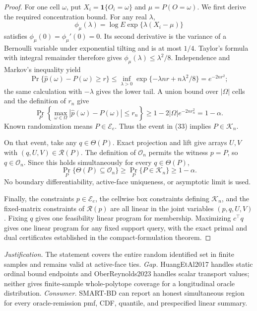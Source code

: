\documentclass{article}
\begin{document}
\begin{proof}
For one cell \(\omega\), put \(X_i=\mathbf 1\{O_i=\omega\}\) and \(\mu=P(O=\omega)\).  We first derive the required concentration bound.  For any real \(\lambda\),
\[
 \phi_\mu(\lambda)
 =\log E\exp\{\lambda(X_i-\mu)\}
\]
satisfies \(\phi_\mu(0)=\phi_\mu'(0)=0\).  Its second derivative is the variance of a Bernoulli variable under exponential tilting and is at most \(1/4\).  Taylor's formula with integral remainder therefore gives \(\phi_\mu(\lambda)\leq\lambda^2/8\).  Independence and Markov's inequality yield
\[
 \Pr\{\widehat p(\omega)-P(\omega)\geq r\}
 \leq\inf_{\lambda>0}\exp\{-\lambda nr+n\lambda^2/8\}
 =e^{-2nr^2};                                             \tag{32}
\]
the same calculation with \(-\lambda\) gives the lower tail.  A union bound over \(|\Omega|\) cells and the definition of \(r_n\) give
\[
 \Pr_P\!\left\{\max_{\omega\in\Omega}
 |\widehat p(\omega)-P(\omega)|\leq r_n\right\}
 \geq1-2|\Omega|e^{-2nr_n^2}=1-\alpha.                   \tag{33}
\]
Known randomization means \(P\in\mathcal E_e\).  Thus the event in (33) implies \(P\in\mathcal K_n\).

On that event, take any \(q\in\Theta(P)\).  Exact projection and lift give arrays \(U,V\) with \((q,U,V)\in\mathcal R(P)\).  The definition of \(\mathcal O_n\) permits the witness \(p=P\), so \(q\in\mathcal O_n\).  Since this holds simultaneously for every \(q\in\Theta(P)\),
\[
 \Pr_P\{\Theta(P)\subseteq\mathcal O_n\}
 \geq\Pr_P\{P\in\mathcal K_n\}\geq1-\alpha.            \tag{34}
\]
No boundary differentiability, active-face uniqueness, or asymptotic limit is used.

Finally, the constraints \(p\in\mathcal E_e\), the cellwise box constraints defining \(\mathcal K_n\), and the fixed-matrix constraints of \(\mathcal R(p)\) are all linear in the joint variables \((p,q,U,V)\).  Fixing \(q\) gives one feasibility linear program for membership.  Maximizing \(c^\top q\) gives one linear program for any fixed support query, with the exact primal and dual certificates established in the compact-formulation theorem.
\end{proof}
\par\smallskip\noindent \textit{Justification.} The statement covers the entire random identified set in finite samples and remains valid at active-face ties. \textit{Gap.} HuangEtAl2017 handles static ordinal bound endpoints and OberReynolds2023 handles scalar transport values; neither gives finite-sample whole-polytope coverage for a longitudinal oracle distribution. \textit{Consumer.} SMART-BD can report an honest simultaneous region for every oracle-remission pmf, CDF, quantile, and prespecified linear summary.
\end{document}
